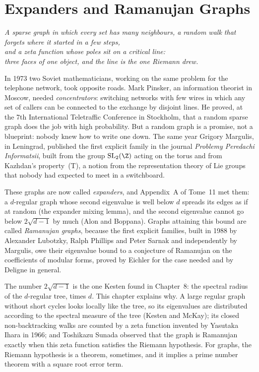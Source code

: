 \chapter{Expanders and Ramanujan Graphs}

\begin{center}\itshape
A sparse graph in which every set has many neighbours, a random walk that forgets where it started in a few steps,\\
and a zeta function whose poles sit on a critical line:\\
three faces of one object, and the line is the one Riemann drew.
\end{center}

In 1973 two Soviet mathematicians, working on the same problem for the telephone network, took opposite roads. Mark Pinsker, an information theorist in Moscow, needed \emph{concentrators}: switching networks with few
wires in which any set of callers can be connected to the exchange by disjoint lines. He proved, at the 7th International Teletraffic Conference in Stockholm, that a random sparse graph does the job with
high probability. But a random graph is a promise, not a blueprint: nobody knew how to write one down. The same year Grigory Margulis, in Leningrad, published the first explicit family in the journal
\emph{Problemy Peredachi Informatsii}, built from the group $\mathrm{SL}_2(\Z)$ acting on the torus and from Kazhdan's property~(T), a notion from the representation theory of Lie groups that nobody
had expected to meet in a switchboard.

These graphs are now called \emph{expanders}, and Appendix~A of Tome~11 met them: a $d$-regular graph whose second eigenvalue is well below $d$ spreads its edges as if at random (the expander mixing lemma), and
the second eigenvalue cannot go below $2\sqrt{d-1}$ by much (Alon and Boppana). Graphs attaining this bound are called \emph{Ramanujan graphs}, because the first explicit families, built in 1988 by Alexander
Lubotzky, Ralph Phillips and Peter Sarnak and independently by Margulis, owe their eigenvalue bound to a conjecture of Ramanujan on the coefficients of modular forms, proved by Eichler for the case needed
and by Deligne in general.

The number $2\sqrt{d-1}$ is the one Kesten found in Chapter~8: the spectral radius of the $d$-regular tree, times $d$. This chapter explains why. A large regular graph without short cycles looks locally
like the tree, so its eigenvalues are distributed according to the spectral measure of the tree (Kesten and McKay); its closed non-backtracking walks are counted by a zeta function invented by Yasutaka Ihara
in 1966; and Toshikazu Sunada observed that the graph is Ramanujan exactly when this zeta function satisfies the Riemann hypothesis. For graphs, the Riemann hypothesis is a theorem, sometimes, and it
implies a prime number theorem with a square root error term.


